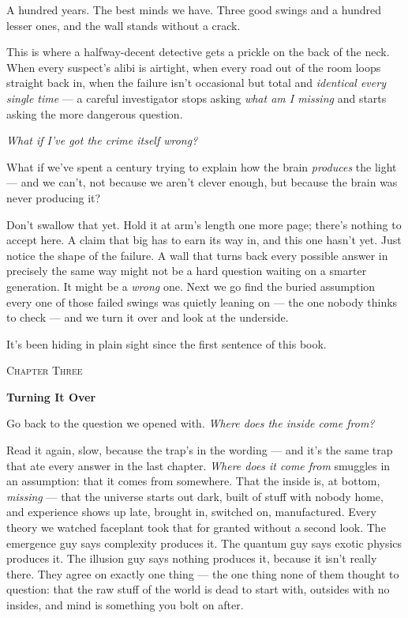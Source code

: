 \documentclass[11pt,openany]{book}
\begin{document}
A hundred years. The best minds we have. Three good swings and a hundred lesser ones, and the wall stands without a crack.

This is where a halfway-decent detective gets a prickle on the back of the neck. When every suspect’s alibi is airtight, when every road out of the room loops straight back in, when the failure isn’t occasional but total and \textit{identical every single time} — a careful investigator stops asking \textit{what am I missing} and starts asking the more dangerous question.

\textit{What if I’ve got the crime itself wrong?}

What if we’ve spent a century trying to explain how the brain \textit{produces} the light — and we can’t, not because we aren’t clever enough, but because the brain was never producing it?

Don’t swallow that yet. Hold it at arm’s length one more page; there’s nothing to accept here. A claim that big has to earn its way in, and this one hasn’t yet. Just notice the shape of the failure. A wall that turns back every possible answer in precisely the same way might not be a hard question waiting on a smarter generation. It might be a \textit{wrong} one. Next we go find the buried assumption every one of those failed swings was quietly leaning on — the one nobody thinks to check — and we turn it over and look at the underside.

It’s been hiding in plain sight since the first sentence of this book.


\clearpage
\vspace*{0.6in}
{\centering\scshape\large Chapter Three\par}
\vspace{0.8em}
{\centering\bfseries\fontsize{20}{24}\selectfont Turning It Over\par}
\vspace{1.6em}

Go back to the question we opened with. \textit{Where does the inside come from?}

Read it again, slow, because the trap’s in the wording — and it’s the same trap that ate every answer in the last chapter. \textit{Where does it come from} smuggles in an assumption: that it comes from somewhere. That the inside is, at bottom, \textit{missing} — that the universe starts out dark, built of stuff with nobody home, and experience shows up late, brought in, switched on, manufactured. Every theory we watched faceplant took that for granted without a second look. The emergence guy says complexity produces it. The quantum guy says exotic physics produces it. The illusion guy says nothing produces it, because it isn’t really there. They agree on exactly one thing — the one thing none of them thought to question: that the raw stuff of the world is dead to start with, outsides with no insides, and mind is something you bolt on after.
\end{document}
